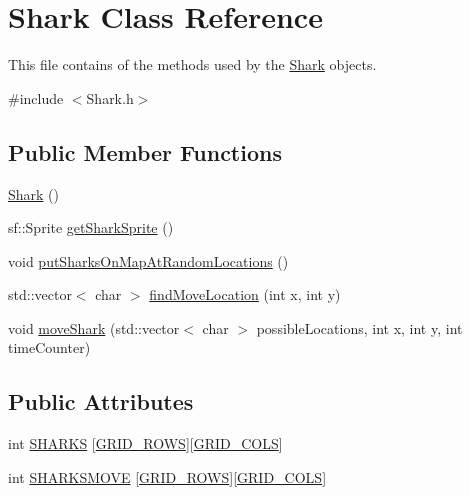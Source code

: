 \hypertarget{class_shark}{}\section{Shark Class Reference}
\label{class_shark}


This file contains of the methods used by the \hyperlink{class_shark}{Shark} objects.  




{\ttfamily \#include $<$Shark.\+h$>$}

\subsection*{Public Member Functions}
\begin{DoxyCompactItemize}
\item 
\hyperlink{class_shark_aadf418d0bebc47d351a1c5c7e427d93a}{Shark} ()
\item 
sf\+::\+Sprite \hyperlink{class_shark_a9b865207240b1b7620bb9b825e0cb06d}{get\+Shark\+Sprite} ()
\item 
void \hyperlink{class_shark_a45627e4700fc05d5a9e54283a76348f8}{put\+Sharks\+On\+Map\+At\+Random\+Locations} ()
\item 
std\+::vector$<$ char $>$ \hyperlink{class_shark_a4979baf6f9d2351a52fe816d597114d9}{find\+Move\+Location} (int x, int y)
\item 
void \hyperlink{class_shark_ae969adad351a5e31853208003e186eb4}{move\+Shark} (std\+::vector$<$ char $>$ possible\+Locations, int x, int y, int time\+Counter)
\end{DoxyCompactItemize}
\subsection*{Public Attributes}
\begin{DoxyCompactItemize}
\item 
int \hyperlink{class_shark_a21ce8940cbf1ded5529002c42dd01595}{S\+H\+A\+R\+KS} \mbox{[}\hyperlink{_config_8h_a5ba0b105774bfdc09ce545d73dcdedd3}{G\+R\+I\+D\+\_\+\+R\+O\+WS}\mbox{]}\mbox{[}\hyperlink{_config_8h_a881e2cda79b5951641b07f678f6ef929}{G\+R\+I\+D\+\_\+\+C\+O\+LS}\mbox{]}
\item 
int \hyperlink{class_shark_aa03f93cdce80f7dac4c26e4bb73d0547}{S\+H\+A\+R\+K\+S\+M\+O\+VE} \mbox{[}\hyperlink{_config_8h_a5ba0b105774bfdc09ce545d73dcdedd3}{G\+R\+I\+D\+\_\+\+R\+O\+WS}\mbox{]}\mbox{[}\hyperlink{_config_8h_a881e2cda79b5951641b07f678f6ef929}{G\+R\+I\+D\+\_\+\+C\+O\+LS}\mbox{]}
\end{DoxyCompactItemize}


